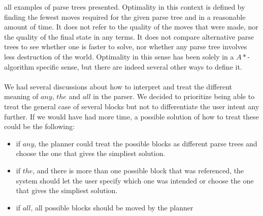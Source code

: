 all examples of parse trees presented. Optimality in this context is defined by
finding the fewest moves required for the given parse tree and in a reasonable
amount of time. It does not refer to the quality of the moves that were made,
nor the quality of the final state in any terms. It does not compare
alternative parse trees to see whether one is faster to solve, nor whether any
parse tree involves less destruction of the world. Optimality in this sense has
been solely in a $A*$-algorithm specific sense, but there are indeed several
other ways to define it.
\\\\
We had several discussions about how to interpret and treat the different
meaning of $any$, $the$ and $all$ in the parser. We decided to prioritize being
able to treat the general case of several blocks but not to differentiate the
user intent any further. If we would have had more time, a possible solution of
how to treat these could be the following: 

\begin{itemize}
\item if $any$, the planner could treat the possible blocks as different parse
    trees and choose the one that gives the simpliest solution.  
\item if $the$, and there is more than one possible block that was referenced,
    the system should let the user specify which one was intended or choose the
    one that gives the simpliest solution. 
\item if $all$, all possible blocks should be moved by the planner
\end{itemize}
